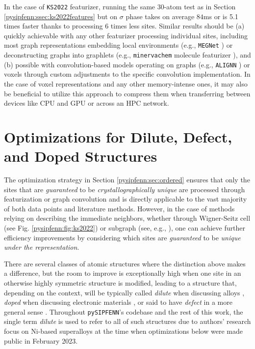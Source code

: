 In the case of \texttt{KS2022} featurizer, running the same 30-atom test as in Section \ref{pysipfenn:ssec:ks2022features} but on $\sigma$ phase takes on average $84$ms or is 5.1 times faster thanks to processing 6 times less sites. Similar results should be (a) quickly achievable with any other featurizer processing individual sites, including most graph representations embedding local environments (e.g., \texttt{MEGNet} \cite{Chen2019GraphCrystals}) or deconstructing graphs into graphlets (e.g., \texttt{minervachem} molecule featurizer \cite{Tynes2024LinearCheminformatics}), and (b) possible with convolution-based models operating on graphs (e.g., \texttt{ALIGNN} \cite{Choudhary2021AtomisticPredictions}) or voxels \cite{Davariashtiyani2023FormationRepresentation} through custom adjustments to the specific convolution implementation. In the case of voxel representations and any other memory-intense ones, it may also be beneficial to utilize this approach to compress them when transferring between devices like CPU and GPU or across an HPC network.


\section{Optimizations for Dilute, Defect, and Doped Structures} \label{pysipfenn:sec:dilute}

The optimization strategy in Section \ref{pysipfenn:sec:ordered} ensures that only the sites that are \emph{guaranteed} to be \emph{crystallographically unique} are processed through featurization or graph convolution and is directly applicable to the vast majority of both data points and literature methods. However, in the case of methods relying on describing the immediate neighbors, whether through Wigner-Seitz cell (see Fig. \ref{pysipfenn:fig:ks2022}) or subgraph (see, e.g., \cite{Chen2019GraphCrystals}), one can achieve further efficiency improvements by considering which sites are \emph{guaranteed} to be \emph{unique under the representation}.

There are several classes of atomic structures where the distinction above makes a difference, but the room to improve is exceptionally high when one site in an otherwise highly symmetric structure is modified, leading to a structure that, depending on the context, will be typically called \emph{dilute} when discussing alloys \cite{Chong2021CorrelationAlloys}, \emph{doped} when discussing electronic materials \cite{Chen2022InteractionStudy}, or said to have \emph{defect} in a more general sense \cite{Castleton2009DensitySupercells}. Throughout \texttt{pySIPFENN}'s codebase and the rest of this work, the single term \emph{dilute} is used to refer to all of such structures due to authors' research focus on Ni-based superalloys at the time when optimizations below were made public in February 2023.

